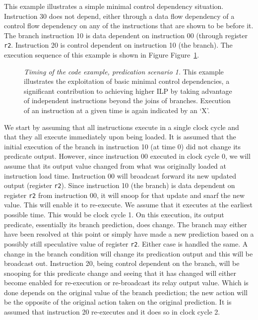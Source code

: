 \documentclass[10pt,dvips]{article}
\begin{document}
This example illustrates a simple minimal control dependency
situation.
Instruction 30 does not depend, either through a data flow dependency
of a control flow dependency on any of the instructions that
are shown to be before it.  The branch instruction 10 is data
dependent on instruction 00 (through register
{\tt r2}.
Instruction 20 is control
dependent on instruction 10 (the branch).
The execution sequence of this example is shown
in Figure
Figure~\ref{pex1}.

\begin{figure}
\centering
{}
\caption{{\em Timing of the code example, predication scenario 1.}
This example illustrates the exploitation of basic minimal control
dependencies, a significant contribution to
achieving higher ILP by taking advantage of independent
instructions beyond the joins of branches.
Execution of an instruction at a given time is
again indicated by an `X'.}
\label{pex1}
\end{figure}


We start by assuming that all instructions execute in a single clock
cycle and that they all execute immediately upon being loaded.
It is assumed that the initial execution of the branch in
instruction 10 (at time 0) did not change its predicate output.
However, since instruction 00 executed in clock cycle 0, we will
assume that its output value changed from what was originally loaded
at instruction load time.  Instruction 00 will broadcast forward
its new updated output (register
{\tt r2}).
Since instruction 10 (the branch) is data dependent on
register
{\tt r2}
from instruction 00, it will snoop for that update
and snarf the new value.  This will enable it to re-execute.
We assume that it executes at the earliest possible time.
This would be clock cycle 1.  On this execution, its output predicate,
essentially its branch prediction, does change.  The branch may either
have been resolved at this point or simply have made a new prediction
based on a possibly still speculative value of register
{\tt r2}.
Either case is handled the same.
A change in the branch condition will change its
predication output and this will be
broadcast out.
Instruction 20, being control dependent on the branch, will be snooping
for this predicate change and seeing that it has changed
will either become enabled for re-execution or re-broadcast
its relay output value.  Which is done depends on the original
value of the branch prediction; the new action will be the opposite
of the original action taken on the original prediction.
It is assumed that instruction 20 re-executes and it does so
in clock cycle 2.
\end{document}
